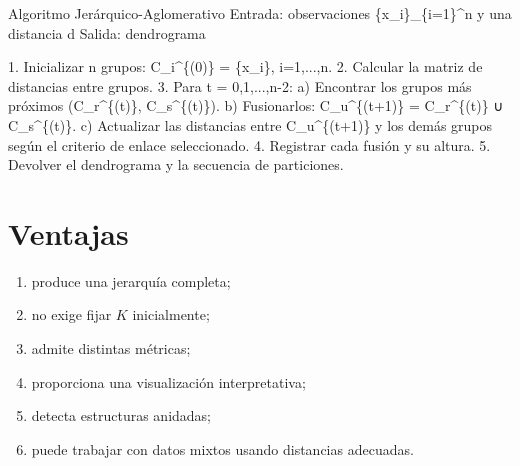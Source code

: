 \documentclass[
  spanish,
  10.5pt,
  letterpaper,
  DIV=11,
  numbers=noendperiod,
  oneside,
  open=any]{scrreprt}
\newenvironment{Shaded}{\begin{snugshade}}{\end{snugshade}}
\newcommand{\NormalTok}[1]{\textcolor[rgb]{0.00,0.23,0.31}{#1}}
\providecommand{\tightlist}{%
  \setlength{\itemsep}{0pt}\setlength{\parskip}{0pt}}
\theoremstyle{definition}
\theoremstyle{definition}
\theoremstyle{plain}
\theoremstyle{remark}
\begin{document}

\begin{tcolorbox}[enhanced jigsaw, arc=.35mm, bottomrule=.15mm, bottomtitle=1mm, breakable, colback=white, colbacktitle=quarto-callout-note-color!10!white, colframe=quarto-callout-note-color-frame, coltitle=black, left=2mm, leftrule=.75mm, opacityback=0, opacitybacktitle=0.6, rightrule=.15mm, title=\textcolor{quarto-callout-note-color}{\faInfo}\hspace{0.5em}{Seudocódigo matemático formal}, titlerule=0mm, toprule=.15mm, toptitle=1mm]

\begin{Shaded}
\begin{Highlighting}[numbers=left,,]
\NormalTok{Algoritmo Jerárquico{-}Aglomerativo}
\NormalTok{Entrada:}
\NormalTok{  observaciones \{x\_i\}\_\{i=1\}\^{}n y una distancia d}
\NormalTok{Salida:}
\NormalTok{  dendrograma}

\NormalTok{1. Inicializar n grupos:}
\NormalTok{      C\_i\^{}\{(0)\} = \{x\_i\},   i=1,...,n.}
\NormalTok{2. Calcular la matriz de distancias entre grupos.}
\NormalTok{3. Para t = 0,1,...,n{-}2:}
\NormalTok{   a) Encontrar los grupos más próximos}
\NormalTok{         (C\_r\^{}\{(t)\}, C\_s\^{}\{(t)\}).}
\NormalTok{   b) Fusionarlos:}
\NormalTok{         C\_u\^{}\{(t+1)\} = C\_r\^{}\{(t)\} ∪ C\_s\^{}\{(t)\}.}
\NormalTok{   c) Actualizar las distancias entre C\_u\^{}\{(t+1)\} y los demás grupos}
\NormalTok{      según el criterio de enlace seleccionado.}
\NormalTok{4. Registrar cada fusión y su altura.}
\NormalTok{5. Devolver el dendrograma y la secuencia de particiones.}
\end{Highlighting}
\end{Shaded}

\end{tcolorbox}

\section*{Ventajas}\label{ventajas-6}


\begin{enumerate}
\def\labelenumi{\arabic{enumi}.}
\tightlist
\item
  produce una jerarquía completa;
\item
  no exige fijar \(K\) inicialmente;
\item
  admite distintas métricas;
\item
  proporciona una visualización interpretativa;
\item
  detecta estructuras anidadas;
\item
  puede trabajar con datos mixtos usando distancias adecuadas.
\end{enumerate}
\end{document}
